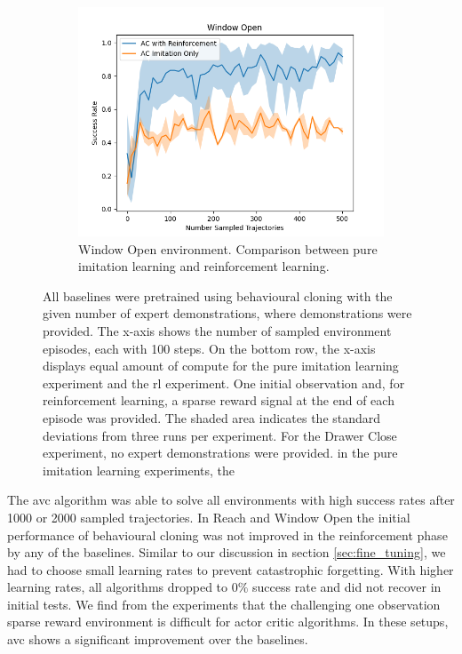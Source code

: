 \begin{figure}[htbp]
\begin{subfigure}[t]{0.45\textwidth}
      \includegraphics[width=\textwidth]{images/1_2000_imi/Window Open.png}
      \caption{Window Open environment. Comparison between pure imitation learning and reinforcement learning.}
    \end{subfigure}
    \caption{
    All baselines were pretrained using behavioural cloning with the given number of expert demonstrations, where demonstrations were provided. 
    The x-axis shows the number of sampled environment episodes, each with 100 steps. On the bottom row, 
    the x-axis displays equal amount of compute for the pure imitation learning experiment and the \ac{rl} experiment. 
    One initial observation and, for reinforcement learning, a sparse reward signal at the end of each episode was provided. 
    The shaded area indicates the standard deviations from three runs per experiment. 
    For the Drawer Close experiment, no expert demonstrations were provided. in the pure imitation learning experiments, the }
    \label{fig:guided_ref}
\end{figure}

The \ac{avc} algorithm was able to solve all environments with high success rates after 1000 or 2000 sampled trajectories. In Reach and Window Open the initial performance
of behavioural cloning was not improved in the reinforcement phase by any of the baselines. Similar to our discussion in section \ref{sec:fine_tuning},
we had to choose small learning rates to prevent catastrophic forgetting. With higher learning rates, all algorithms dropped to $0 \%$ success rate and did
not recover in initial tests. We find from the experiments that the challenging one observation sparse reward environment is difficult for
actor critic algorithms. In these setups, \ac{avc} shows a significant improvement over the baselines.\\

